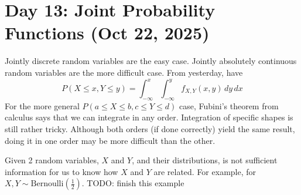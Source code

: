 \section{Day 13: Joint Probability Functions (Oct 22, 2025)}

Jointly discrete random variables are the easy case. Jointly absolutely continuous random variables are the more difficult case. From yesterday, have
\[
P(X \leq x, Y \leq y) = \int_{-\infty}^x \int_{-\infty}^{y} f_{X,Y}(x, y) \, dy \, dx
\]
For the more general $P(a \leq X \leq b, c \leq Y \leq d)$ case, Fubini's theorem from calculus says that we can integrate in any order. Integration of specific shapes is still rather tricky. Although both orders (if done correctly) yield the same result, doing it in one order may be more difficult than the other.

Given 2 random variables, $X$ and $Y$, and their distributions, is not sufficient information for us to know how $X$ and $Y$ are related. For example, for $X, Y \sim \text{Bernoulli}(\frac{1}{2})$. TODO: finish this example
